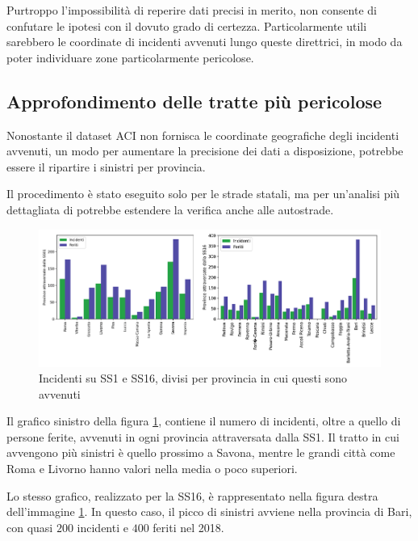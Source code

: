 \documentclass[a4paper,12pt]{report}
\begin{document}
Purtroppo l'impossibilità di reperire dati precisi in merito, 
non consente di confutare le ipotesi con il dovuto grado di certezza.
Particolarmente utili sarebbero le coordinate di incidenti avvenuti lungo queste direttrici, 
in modo da poter individuare zone particolarmente pericolose.

\subsection{Approfondimento delle tratte più pericolose}

Nonostante il dataset ACI non fornisca le coordinate geografiche degli incidenti avvenuti, 
un modo per aumentare la precisione dei dati a disposizione, potrebbe essere il 
ripartire i sinistri per provincia. 

Il procedimento è stato eseguito solo per le strade statali, 
ma per un'analisi più dettagliata di potrebbe estendere la verifica anche alle autostrade.

\begin{figure}
    \includegraphics[width=\linewidth]{img_unite/tratti_ss1_ss16.png}
    \caption{Incidenti su SS1 e SS16, divisi per provincia in cui questi sono avvenuti}
    \label{fig:incidenti-strade-statali}
\end{figure}

Il grafico sinistro della figura \ref{fig:incidenti-strade-statali}, 
contiene il numero di incidenti, oltre a quello di persone ferite, 
avvenuti in ogni provincia attraversata dalla SS1. 
Il tratto in cui avvengono più sinistri è quello prossimo a Savona, 
mentre le grandi città come 
Roma e Livorno hanno valori nella media o poco superiori. 

Lo stesso grafico, realizzato per la SS16, è rappresentato nella figura destra dell'immagine 
\ref{fig:incidenti-strade-statali}. 
In questo caso, il picco di sinistri avviene nella provincia 
di Bari, con quasi $200$ incidenti e $400$ feriti nel 2018. 
\end{document}
